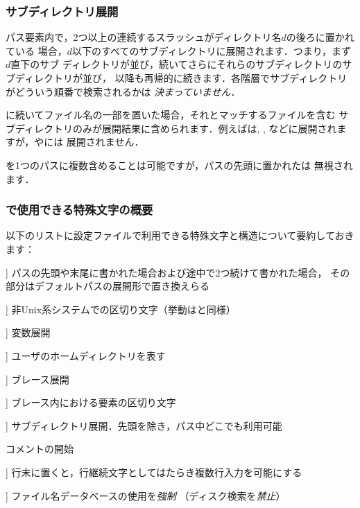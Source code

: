 \documentclass[uplatex,dvipdfmx,tombow]{jsarticle}
\begin{document}
\subsubsection{サブディレクトリ展開}
\label{sec:subdirectory-expansion}

パス要素内で，2つ以上の連続するスラッシュがディレクトリ名$d$の後ろに置かれている
場合，$d$以下のすべてのサブディレクトリに展開されます．つまり，まず$d$直下のサブ
ディレクトリが並び，続いてさらにそれらのサブディレクトリのサブディレクトリが並び，
以降も再帰的に続きます．各階層でサブディレクトリがどういう順番で検索されるかは
\emph{決まっていません}．

\samp{//}に続いてファイル名の一部を置いた場合，それとマッチするファイルを含む
サブディレクトリのみが展開結果に含められます．例えばは,
, などに展開されますが，やには
展開されません．

\samp{//}を1つのパスに複数含めることは可能ですが，パスの先頭に置かれた\samp{//}は
無視されます．

\subsubsection{で使用できる特殊文字の概要}
\label{sec:cnf-special-chars}

以下のリストに\KPS 設定ファイルで利用できる特殊文字と構造について要約しておきます：
%
\begin{description}
\newcommand{\CODE}[1]{\makebox[3em][l]{\code{#1}}}
\item[\CODE{:}] パスの先頭や末尾に書かれた場合および途中で2つ続けて書かれた場合，
  その部分はデフォルトパスの展開形で置き換えらる
\item[\CODE{;}] 非Unix系システムでの区切り文字（挙動は\code{:}と同様）
\item[\CODE{\$}] 変数展開
\item[\CODE{\string~}] ユーザのホームディレクトリを表す
\item[\CODE{\char`\{...\char`\}}] ブレース展開
\item[\CODE{,}] ブレース内における要素の区切り文字
\item[\CODE{//}] サブディレクトリ展開．先頭を除き，パス中どこでも利用可能
\item[{\makebox[3em][l]{\code{\%}{\normalfont と}\code{\#}}}] コメントの開始
\item[\CODE{\bs}] 行末に置くと，行継続文字としてはたらき複数行入力を可能にする
\item[\CODE{!!}] ファイル名データベースの使用を\emph{強制}
  （ディスク検索を\emph{禁止}）
\end{description}
\end{document}
